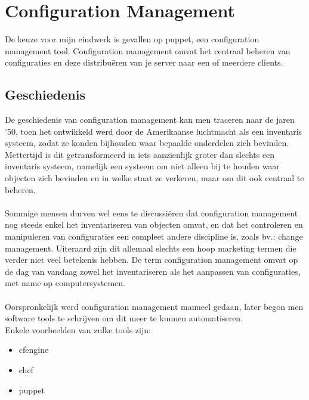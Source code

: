\chapter{Configuration Management}

De keuze voor mijn eindwerk is gevallen op puppet, een configuration management tool. Configuration management omvat het centraal beheren van configuraties en deze distribu\"{e}ren van je server naar een of meerdere clients.


\section{Geschiedenis}

De geschiedenis van configuration management kan men traceren naar de jaren '50, toen het ontwikkeld werd door de Amerikaanse luchtmacht als een inventaris systeem, zodat ze konden bijhouden waar bepaalde onderdelen zich bevinden. Mettertijd is dit getransformeerd in iets aanzienlijk groter dan slechts een inventaris systeem, namelijk een systeem om niet alleen bij te houden waar objecten zich bevinden en in welke staat ze verkeren, maar om dit ook centraal te beheren.\\\\
Sommige mensen durven wel eens te discussi\"{e}ren dat configuration management nog steeds enkel het inventariseren van objecten omvat, en dat het controleren en manipuleren van configuraties een compleet andere discipline is, zoals bv.: change management. Uiteraard zijn dit allemaal slechts een hoop marketing termen die verder niet veel betekenis hebben. De term configuration management omvat op de dag van vandaag zowel het inventariseren als het aanpassen van configuraties, met name op computersystemen.\\\\
Oorspronkelijk werd configuration management manueel gedaan, later begon men software tools te schrijven om dit meer te kunnen automatiseren.\\
Enkele voorbeelden van zulke tools zijn:
\begin{itemize}
\item cfengine
\item chef
\item puppet
\end{itemize}
